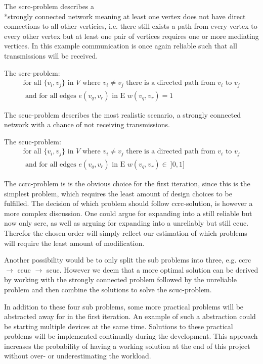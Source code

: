 \noindent The \gls{scrc}-problem describes a \\*strongly connected network meaning at least one vertex does not have direct connections to all other verticies, i.e. there still exists a path from every vertex to every other vertex but at least one pair of vertices requires one or more mediating vertices. 
In this example communication is once again reliable such that all transmissions will be received. 

\begin{definition}
	The \acrshort{scrc}-problem:
	\begin{align*}
		\text{for all } \{v_i, v_j\} \text{ in } V \text{ where } v_i \neq v_j \text{ there is a directed path from } v_i \text{ to } v_j\\
		\text{ and for all edges } e(v_{q}, v_{r}) \text{ in E } w(v_{q}, v_{r}) = 1
	\end{align*}
\end{definition}

\noindent The \gls{scuc}-problem describes the most realistic scenario, a strongly connected network with a chance of not receiving transmissions. 

\begin{definition}\label{SCUC}
	The \acrshort{scuc}-problem:
	\begin{align*}
		\text{for all } \{v_i, v_j\} \text{ in } V \text{ where } v_i \neq v_j \text{ there is a directed path from } v_i \text{ to } v_j\\
		\text{ and for all edges } e(v_{q}, v_{r}) \text{ in E } w(v_{q}, v_{r}) \in\ ]0,1]
	\end{align*}
\end{definition}

\bigskip 
\noindent
The \gls{ccrc}-problem is is the obvious choice for the first iteration, since this is the simplest problem, which requires the least amount of design choices to be fulfilled.
The decision of which problem should follow \gls{ccrc}-solution, is however a more complex discussion.
One could argue for expanding into a still reliable but now only \acrlong{scrc}, as well as arguing for expanding into a unreliably but still \acrlong{ccuc}.
Therefor the chosen order will simply reflect our estimation of which problems will require the least amount of modification.

Another possibility would be to only split the sub problems into three, e.g. \gls{ccrc} $\rightarrow$ \gls{ccuc} $\rightarrow$ \gls{scuc}.
However we deem that a more optimal solution can be derived by working with the strongly connected problem followed by the unreliable problem and then combine the solutions to solve the \gls{scuc}-problem.

In addition to these four sub problems, some more practical problems will be abstracted away for in the first iteration.
An example of such a abstraction could be starting multiple devices at the same time.
Solutions to these practical problems will be implemented continually during the development. 
This approach increases the probability of having a working solution at the end of this project without over- or underestimating the workload. 
